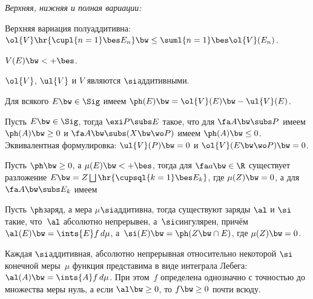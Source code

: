 \documentclass[a4paper]{article}
\begin{document}
\begin{df}
  \emph{Верхняя, нижняя и полная вариации:}
\end{df}

\begin{stm}
  Верхняя вариация полуаддитивна: $\ol{V}\hr{\cupl{n=1}\bes E_n} \bw\le \suml{n=1}\bes \ol{V}(E_n)$.
\end{stm}

\begin{stm}
  $V(E) \bw< +\bes$.
\end{stm}

\begin{stm}
  $\ol{V}$, $\ul{V}$ и $V$ являются $\si$\д аддитивными.
\end{stm}

\begin{theorem}
  Для всякого $E \bw\in \Sig$ имеем $\ph(E) \bw= \ol{V}(E) \bw- \ul{V}(E)$.
\end{theorem}

\begin{theorem}
  Пусть $E \bw\in \Sig$, тогда $\exi P\subs E$ такое, что для $\fa A \bw\subs P$
  имеем $\ph(A) \bw\ge 0$ и $\fa A \bw\subs (X \bw\wo P)$ имеем $\ph(A) \bw\le 0$.
  Эквивалентная формулировка: $\ul{V}(P) \bw= 0$ и $\ol{V}(E \bw\wo P) \bw= 0$.
\end{theorem}

\begin{theorem}
  Пусть $\ph \bw\ge 0$, а $\mu(E) \bw< +\bes$, тогда
  для $\fa a \bw\in \R$ существует разложение
  $E \bw= Z \bigsqcup \hr{\cupsql{k=1}\bes E_k}$, где $\mu(Z) \bw= 0$, а для $\fa A \bw\subs E_k$ имеем
\end{theorem}

\begin{theorem}
  Пусть $\ph$\т заряд, а мера $\mu$\т $\si$\д аддитивна, тогда существуют заряды $\al$ и $\si$ такие,
  что~$\al$ абсолютно непрерывен, а~$\si$\т сингулярен, причём $\al(E) \bw= \ints{E}f\,d\mu$,
  а~$\si(E) \bw= \ph(Z \bw\cap E)$, где $\mu(Z) \bw= 0$.
\end{theorem}

\begin{theorem}
  Каждая $\si$\д аддитивная, абсолютно непрерывная
  относительно некоторой $\si$\д конечной меры~$\mu$ функция
  представима в виде интеграла Лебега: $\al(A) \bw= \ints{A}f\,d\mu$.
  При этом~$f$ определена однозначно с точностью до множества меры нуль,
  а если $\al \bw\ge 0$, то $f \bw\ge 0$ почти всюду.
\end{theorem}
\end{document}
